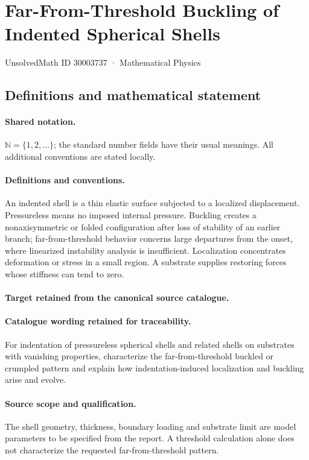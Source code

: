 \documentclass[11pt]{article}
\begin{document}
\setcounter{section}{30003736}
\section{Far-From-Threshold Buckling of Indented Spherical Shells}\label{30003737}
{\small UnsolvedMath ID 30003737 · Mathematical Physics}
\subsection{Definitions and mathematical statement}

\paragraph{Shared notation.}$\mathbb N=\{1,2,\ldots\}$; the standard number fields have their usual meanings. All additional conventions are stated locally.


\paragraph{Definitions and conventions.}
An indented shell is a thin elastic surface subjected to a localized displacement. Pressureless means no imposed internal pressure. Buckling creates a nonaxisymmetric or folded configuration after loss of stability of an earlier branch; far-from-threshold behavior concerns large departures from the onset, where linearized instability analysis is insufficient. Localization concentrates deformation or stress in a small region. A substrate supplies restoring forces whose stiffness can tend to zero.

\paragraph{Target retained from the canonical source catalogue.}
\paragraph{Catalogue wording retained for traceability.}
For indentation of pressureless spherical shells and related shells on substrates with vanishing properties, characterize the far-from-threshold buckled or crumpled pattern and explain how indentation-induced localization and buckling arise and evolve.

\paragraph{Source scope and qualification.}
The shell geometry, thickness, boundary loading and substrate limit are model parameters to be specified from the report. A threshold calculation alone does not characterize the requested far-from-threshold pattern.
\end{document}
